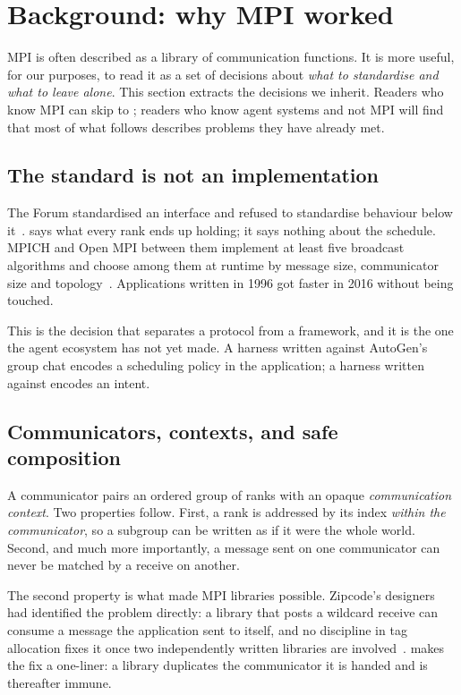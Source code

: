 \section{Background: why MPI worked}
\label{sec:background}

MPI is often described as a library of communication functions. It is more
useful, for our purposes, to read it as a set of decisions about
\emph{what to standardise and what to leave alone}. This section extracts the
decisions we inherit. Readers who know MPI can skip to
; readers who know agent systems and not MPI will find
that most of what follows describes problems they have already met.

\subsection{The standard is not an implementation}

The Forum standardised an interface and refused to standardise
behaviour below it~\cite{mpi-forum-1994}.  says what every
rank ends up holding; it says nothing about the schedule. MPICH and Open MPI
between them implement at least five broadcast algorithms and choose among
them at runtime by message size, communicator size and
topology~\cite{Thakur2005,Chan2007}. Applications
written in 1996 got faster in 2016 without being touched.

This is the decision that separates a protocol from a framework, and it is
the one the agent ecosystem has not yet made. A harness written against
AutoGen's group chat encodes a scheduling policy in the application; a
harness written against  encodes an intent.

\subsection{Communicators, contexts, and safe composition}
\label{sec:bg-contexts}

A communicator pairs an ordered group of ranks with an opaque
\emph{communication context}. Two properties follow. First, a rank is
addressed by its index \emph{within the communicator}, so a subgroup can be
written as if it were the whole world. Second, and much more importantly, a
message sent on one communicator can never be matched by a receive on
another.

The second property is what made MPI libraries possible. Zipcode's designers
had identified the problem directly: a library that posts a wildcard receive
can consume a message the application sent to itself, and no discipline in
tag allocation fixes it once two independently written libraries are
involved~\cite{skjellum1994zipcode}.  makes the fix a
one-liner: a library duplicates the communicator it is handed and is
thereafter immune.


